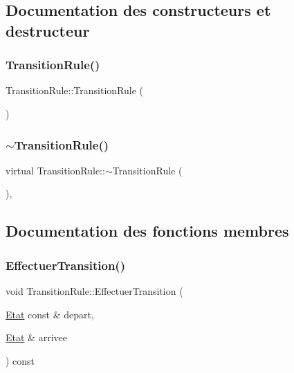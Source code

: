 \subsection{Documentation des constructeurs et destructeur}
\mbox{\label{class_transition_rule_a591c4ae5d292f814e4a72ac8576c9a9e}} 
\subsubsection{\texorpdfstring{Transition\+Rule()}{TransitionRule()}}
{\footnotesize\ttfamily Transition\+Rule\+::\+Transition\+Rule (\begin{DoxyParamCaption}{ }\end{DoxyParamCaption})\hspace{0.3cm}{\ttfamily [default]}}

\mbox{\label{class_transition_rule_a3d373f682379d3569ddf0cd3d8819422}} 
\subsubsection{\texorpdfstring{$\sim$\+Transition\+Rule()}{~TransitionRule()}}
{\footnotesize\ttfamily virtual Transition\+Rule\+::$\sim$\+Transition\+Rule (\begin{DoxyParamCaption}{ }\end{DoxyParamCaption})\hspace{0.3cm}{\ttfamily [virtual]}, {\ttfamily [default]}}



\subsection{Documentation des fonctions membres}
\mbox{\label{class_transition_rule_a8570188a32e648ce3c08e76065f88fb7}} 
\subsubsection{\texorpdfstring{Effectuer\+Transition()}{EffectuerTransition()}}
{\footnotesize\ttfamily void Transition\+Rule\+::\+Effectuer\+Transition (\begin{DoxyParamCaption}\item[{\mbox{\hyperlink{class_etat}{Etat}} const \&}]{depart,  }\item[{\mbox{\hyperlink{class_etat}{Etat}} \&}]{arrivee }\end{DoxyParamCaption}) const\hspace{0.3cm}{\ttfamily [virtual]}}

